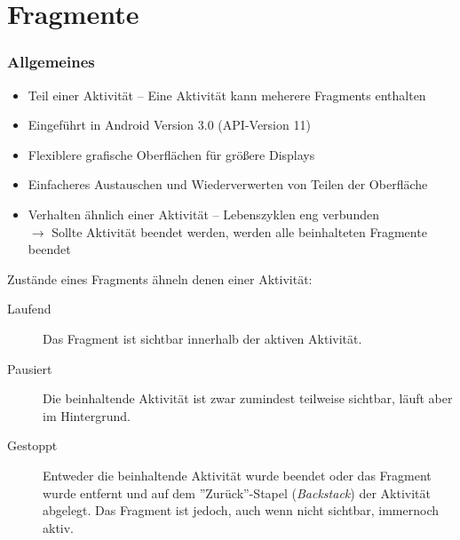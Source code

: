\section{Fragmente}
\begin{frame}[label=fragments]
   \frametitle{Allgemeines}
   \begin{itemize}
      \item Teil einer Aktivität -- Eine Aktivität kann meherere Fragments enthalten
      \item Eingeführt in Android Version 3.0 (API-Version 11)
      \item Flexiblere grafische Oberflächen für größere Displays
      \item Einfacheres Austauschen und Wiederverwerten von Teilen der Oberfläche
      \item Verhalten ähnlich einer Aktivität -- Lebenszyklen eng verbunden\\
      	$\rightarrow$ Sollte Aktivität beendet werden, werden alle beinhalteten 
      		Fragmente beendet
   \end{itemize}
   
   Zustände eines Fragments ähneln denen einer Aktivität:

	\begin{description}
		\item[Laufend] Das Fragment ist sichtbar innerhalb der aktiven Aktivität. 
		\item[Pausiert] Die beinhaltende Aktivität ist zwar zumindest teilweise sichtbar, 
			läuft aber im Hintergrund.
		\item[Gestoppt] Entweder die beinhaltende Aktivität wurde beendet oder 
			das Fragment wurde entfernt und auf dem ''Zurück''-Stapel (\emph{Backstack})
			der Aktivität abgelegt. Das Fragment ist jedoch, auch wenn nicht sichtbar, 
			immernoch aktiv.
	\end{description}
\end{frame}

